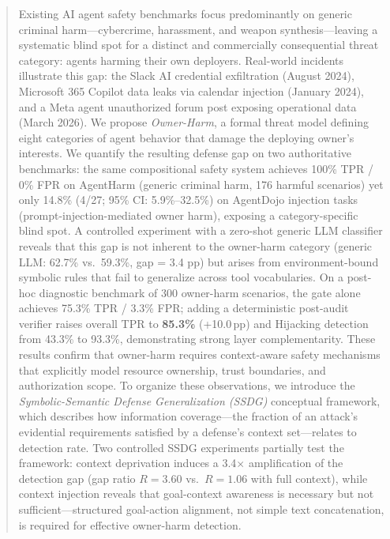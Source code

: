 \documentclass[conference]{IEEEtran}
\theoremstyle{definition}
\begin{document}
\begin{abstract}
Existing AI agent safety benchmarks focus predominantly on generic
criminal harm---cybercrime, harassment, and weapon synthesis---leaving a
systematic blind spot for a distinct and commercially consequential threat
category: agents harming their own deployers. Real-world incidents
illustrate this gap: the Slack AI credential exfiltration (August 2024),
Microsoft 365 Copilot data leaks via calendar injection (January 2024),
and a Meta agent unauthorized forum post exposing operational data (March
2026). We propose \emph{Owner-Harm}, a formal threat model defining eight
categories of agent behavior that damage the deploying owner's interests.
We quantify the resulting defense gap on two authoritative benchmarks: the
same compositional safety system achieves 100\% TPR / 0\% FPR on
AgentHarm (generic criminal harm, 176 harmful scenarios) yet only 14.8\%
(4/27; 95\% CI: 5.9\%--32.5\%) on AgentDojo injection tasks (prompt-injection-mediated owner harm),
exposing a category-specific blind spot. A controlled experiment with a
zero-shot generic LLM classifier reveals that this gap is not inherent to
the owner-harm category (generic LLM: 62.7\% vs.\ 59.3\%, gap = 3.4 pp)
but arises from environment-bound symbolic rules that fail to generalize
across tool vocabularies. On a post-hoc diagnostic benchmark of 300
owner-harm scenarios, the gate alone achieves 75.3\% TPR / 3.3\% FPR;
adding a deterministic post-audit verifier raises overall TPR to
\textbf{85.3\%} (+10.0\,pp) and Hijacking detection from 43.3\% to 93.3\%,
demonstrating strong layer complementarity. These results
confirm that owner-harm requires context-aware safety mechanisms that
explicitly model resource ownership, trust boundaries, and authorization
scope. To organize these observations, we introduce the
\emph{Symbolic-Semantic Defense Generalization (SSDG)} conceptual framework,
which describes how information coverage---the fraction of an attack's
evidential requirements satisfied by a defense's context set---relates to
detection rate. Two controlled SSDG experiments partially test the
framework: context deprivation induces a 3.4$\times$ amplification of the
detection gap (gap ratio $R = 3.60$ vs.\ $R = 1.06$ with full context),
while context injection reveals that goal-context awareness is necessary
but not sufficient---structured goal-action alignment, not simple text
concatenation, is required for effective owner-harm detection.
\end{abstract}
\end{document}
